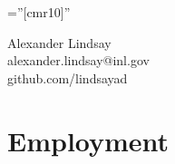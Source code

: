 \documentclass[a4paper,10pt]{article} %
\begin{document}
\pagestyle{empty} %

\font\fb=''[cmr10]'' %

\begin{center}
{\Large Alexander Lindsay}\\
alexander.lindsay@inl.gov\\
github.com/lindsayad\\
\end{center}


\section{Employment}
\end{document}
